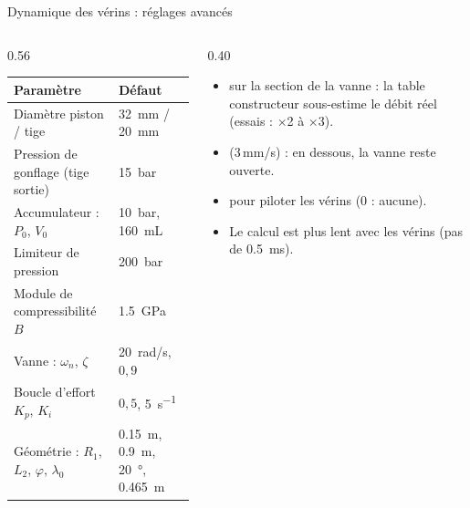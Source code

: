 \documentclass[aspectratio=169,9pt]{beamer}
\begin{document}
\begin{frame}{Dynamique des vérins : réglages avancés}
  \small
  \begin{columns}[T]
  \begin{column}{0.56\textwidth}
    \begin{tabular}{@{}p{5.2cm}l@{}}
      \toprule
      Paramètre & Défaut\\\midrule
      Diamètre piston / tige & \SI{32}{mm} / \SI{20}{mm}\\
      Pression de gonflage (tige sortie) & \SI{15}{bar}\\
      Accumulateur : $P_0$, $V_0$ & \SI{10}{bar}, \SI{160}{mL}\\
      Limiteur de pression & \SI{200}{bar}\\
      Module de compressibilité $B$ & \SI{1,5}{GPa}\\
      Vanne : $\omega_n$, $\zeta$ & \SI{20}{rad/s}, $0{,}9$\\
      Boucle d'effort $K_p$, $K_i$ & $0{,}5$, \SI{5}{s^{-1}}\\
      Géométrie : $R_1$, $L_2$, $\varphi$, $\lambda_0$ & \SI{0,15}{m}, \SI{0,9}{m}, \SI{20}{\degree}, \SI{0,465}{m}\\\bottomrule
    \end{tabular}
  \end{column}
  \begin{column}{0.40\textwidth}
    \begin{itemize}
      \item {} sur la section de la vanne : la table constructeur sous-estime le débit réel (essais : ×2 à ×3).
      \item {} (3\,mm/s) : en dessous, la vanne reste ouverte.
      \item {} pour piloter les vérins (0 : aucune).
      \item Le calcul est plus lent avec les vérins (pas de \SI{0,5}{ms}).
    \end{itemize}
  \end{column}
  \end{columns}
\end{frame}
\end{document}
